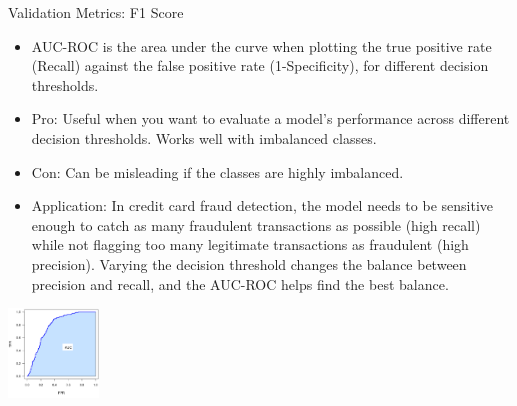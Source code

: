 \documentclass[aspectratio=169]{../latex_main/tntbeamer}  %
\begin{document}
        \begin{frame}[c]{Validation Metrics: F1 Score}

        \vspace{-1em}
        \begin{itemize}
            \item AUC-ROC is the area under the curve when plotting the true positive rate (Recall) against the false positive rate (1-Specificity), for different decision thresholds.
            \item \alert{Pro:}  Useful when you want to evaluate a model's performance across different decision thresholds. Works well with imbalanced classes.
            \item \alert{Con:}  Can be misleading if the classes are highly imbalanced.
            \item \alert{Application:} In credit card fraud detection, the model needs to be sensitive enough to catch as many fraudulent transactions as possible (high recall) while not flagging too many legitimate transactions as fraudulent (high precision). Varying the decision threshold changes the balance between precision and recall, and the AUC-ROC helps find the best balance.
        \end{itemize}

        \centering
        \bigskip

        \includegraphics[width=0.18\textwidth]{figure/Basic_AUC_annotated.png}

	\end{frame}
 
 
\end{document}
